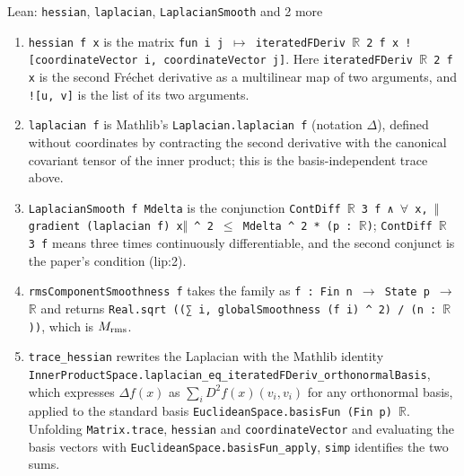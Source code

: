 \documentclass[11pt,a4paper]{report}
\begin{document}
\begin{leanbox}{Lean: \texttt{hessian}, \texttt{laplacian}, \texttt{LaplacianSmooth} and 2 more}
\begin{enumerate}
\item \texttt{hessian f x} is the matrix \texttt{fun i j \ensuremath{\mapsto} iterated\allowbreak{}FDeriv \ensuremath{\mathbb R} 2 f x ![coordinate\allowbreak{}Vector i, coordinate\allowbreak{}Vector j]}. Here \texttt{iterated\allowbreak{}FDeriv \ensuremath{\mathbb R} 2 f x} is the second Fréchet derivative as a multilinear map of two arguments, and \texttt{![u, v]} is the list of its two arguments.

\item \texttt{laplacian f} is Mathlib's \texttt{Laplacian.\allowbreak{}laplacian f} (notation \(\Delta\)), defined without coordinates by contracting the second derivative with the canonical covariant tensor of the inner product; this is the basis-independent trace above.

\item \texttt{Laplacian\allowbreak{}Smooth f Mdelta} is the conjunction \texttt{Cont\allowbreak{}Diff \ensuremath{\mathbb R} 3 f ∧ \ensuremath{\forall} x, \ensuremath{\Vert}gradient (laplacian f) x\ensuremath{\Vert} \textasciicircum{} 2 \ensuremath{\le} Mdelta \textasciicircum{} 2 * (p : \ensuremath{\mathbb R})}; \texttt{Cont\allowbreak{}Diff \ensuremath{\mathbb R} 3 f} means three times continuously differentiable, and the second conjunct is the paper's condition (lip:2).

\item \texttt{rms\allowbreak{}Component\allowbreak{}Smoothness f} takes the family as \texttt{f : Fin n \ensuremath{\to} State p \ensuremath{\to} \ensuremath{\mathbb R}} and returns \texttt{Real.\allowbreak{}sqrt ((∑ i, global\allowbreak{}Smoothness (f i) \textasciicircum{} 2) /\allowbreak{} (n : \ensuremath{\mathbb R}))}, which is \(M_{\rm rms}\).

\item \texttt{trace\_\allowbreak{}hessian} rewrites the Laplacian with the Mathlib identity \texttt{Inner\allowbreak{}Product\allowbreak{}Space.\allowbreak{}laplacian\_\allowbreak{}eq\_\allowbreak{}iterated\allowbreak{}FDeriv\_\allowbreak{}orthonormal\allowbreak{}Basis}, which expresses \(\Delta f(x)\) as \(\sum_iD^2f(x)(v_i,v_i)\) for any orthonormal basis, applied to the standard basis \texttt{Euclidean\allowbreak{}Space.\allowbreak{}basis\allowbreak{}Fun (Fin p) \ensuremath{\mathbb R}}. Unfolding \texttt{Matrix.\allowbreak{}trace}, \texttt{hessian} and \texttt{coordinate\allowbreak{}Vector} and evaluating the basis vectors with \texttt{Euclidean\allowbreak{}Space.\allowbreak{}basis\allowbreak{}Fun\_\allowbreak{}apply}, \texttt{simp} identifies the two sums.

\end{enumerate}
\end{leanbox}
\end{document}
